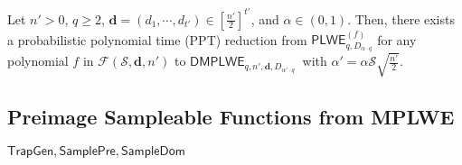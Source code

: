 \documentclass[runningheads]{llncs}
\begin{document}
\begin{theorem} Let $n'>0$, $q\geq 2$, $\mathbf{d}=(d_1, \cdots, d_{t'})\in [\frac{n'}{2}]^{t'}$, and $\alpha \in (0,1)$. Then, there exists a probabilistic polynomial time (PPT) reduction from $\mathsf{PLWE}^{(f)}_{q, D_{\alpha \cdot q}}$ for any polynomial $f$ in $\mathcal{F}(\mathcal{S}, \mathbf{d}, n')$ to $\mathsf{DMPLWE}_{q,n',\textbf{d}, D_{\alpha' \cdot q}}\
$ with $\alpha'=\alpha\mathcal{S} \sqrt{\frac{n'}{2}}$. 

\end{theorem}

\iffalse

\subsection{Preimage Sampleable Functions from MPLWE}
$\mathsf{TrapGen}, \mathsf{SamplePre}, \mathsf{SampleDom}$
\end{document}
